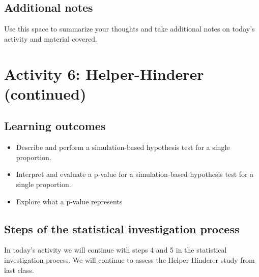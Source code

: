 \documentclass[
]{report}
\begin{document}
\hypertarget{additional-notes-8}{%
\subsection{Additional notes}\label{additional-notes-8}}

Use this space to summarize your thoughts and take additional notes on today's activity and material covered.

\newpage

\hypertarget{activity-6-helper-hinderer-continued}{%
\section{Activity 6: Helper-Hinderer (continued)}\label{activity-6-helper-hinderer-continued}}


\hypertarget{learning-outcomes-11}{%
\subsection{Learning outcomes}\label{learning-outcomes-11}}

\begin{itemize}
\item
  Describe and perform a simulation-based hypothesis test for a single proportion.
\item
  Interpret and evaluate a p-value for a simulation-based hypothesis test for a single proportion.
\item
  Explore what a p-value represents
\end{itemize}

\hypertarget{steps-of-the-statistical-investigation-process-2}{%
\subsection{Steps of the statistical investigation process}\label{steps-of-the-statistical-investigation-process-2}}

In today's activity we will continue with steps 4 and 5 in the statistical investigation process. We will continue to assess the Helper-Hinderer study from last class.
\end{document}
